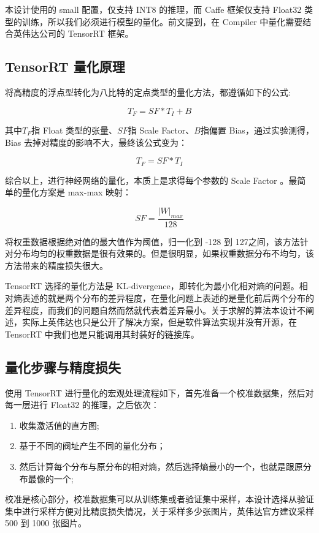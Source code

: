 本设计使用的 small 配置，仅支持 INT8 的推理，而 Caffe 框架仅支持 Float32 类型的训练，所以我们必须进行模型的量化。前文提到，在 Compiler 中量化需要结合英伟达公司的 TensorRT 框架。

\subsection{TensorRT 量化原理}

将高精度的浮点型转化为八比特的定点类型的量化方法，都遵循如下的公式:

$$ T_F = SF * T_I + B $$


其中$T_F$指 Float 类型的张量、$SF$指 Scale Factor、$B$指偏置 Bias，通过实验测得，Bias 去掉对精度的影响不大，最终该公式变为：

$$ T_F = SF * T_I $$

综合以上，进行神经网络的量化，本质上是求得每个参数的 Scale Factor 。最简单的量化方案是 max-max 映射：

$$ SF = \frac{|W|_{max}}{128} $$

将权重数据根据绝对值的最大值作为阈值，归一化到 -128 到 127之间，该方法针对分布均匀的权重数据是很有效果的。但是很明显，如果权重数据分布不均匀，该方法带来的精度损失很大。

TensorRT 选择的量化方法是 KL-divergence，即转化为最小化相对熵的问题\cite{shen2019highly}。相对熵表述的就是两个分布的差异程度，在量化问题上表述的是量化前后两个分布的差异程度，而我们的问题自然而然就代表着差异最小。关于求解的算法本设计不阐述，实际上英伟达也只是公开了解决方案，但是软件算法实现并没有开源，在 TensorRT 中我们也是只能调用其封装好的链接库。

\subsection{量化步骤与精度损失}

使用 TensorRT 进行量化的宏观处理流程如下，首先准备一个校准数据集，然后对每一层进行 Float32 的推理，之后依次：

\begin{enumerate}
    \item 收集激活值的直方图;
    \item 基于不同的阀址产生不同的量化分布；
    \item 然后计算每个分布与原分布的相对熵，然后选择熵最小的一个，也就是跟原分布最像的一个;
\end{enumerate}

校准是核心部分，校准数据集可以从训练集或者验证集中采样，本设计选择从验证集中进行采样方便对比精度损失情况，关于采样多少张图片，英伟达官方建议采样 500 到 1000 张图片。


